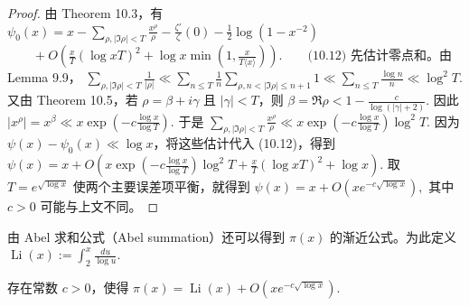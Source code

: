 \begin{proof}
	由 Theorem 10.3，有
	\(\textstyle \psi_0(x) =\allowbreak{} x - \sum_{\rho,\allowbreak{} |\Im\rho|<T}\frac{x^\rho}{\rho} - \frac{\zeta'}{\zeta}(0) - \frac12\log(1-x^{-2})\) \(\textstyle \qquad+\allowbreak{} O\left( \frac{x}{T}(\log xT)^2 +\allowbreak{} \log x\min\left(1,\allowbreak{}\frac{x}{T\langle x\rangle}\right) \right). \qquad\text{(10.12)}\)
	先估计零点和。由 Lemma 9.9，
	\(\textstyle \sum_{\rho,\allowbreak{} |\Im\rho|<T}\frac1{|\rho|} \ll\allowbreak{} \sum_{n\leq\allowbreak{} T} \frac1n \sum_{\rho,\allowbreak{} n<|\Im\rho|\leq\allowbreak{} n+\allowbreak{}1}1 \ll\allowbreak{} \sum_{n\leq\allowbreak{} T}\frac{\log n}{n} \ll\allowbreak{} \log^2 T.\)
	又由 Theorem 10.5，若 $\rho=\beta+i\gamma$ 且 $|\gamma|<T$，则
	\(\textstyle \beta =\allowbreak{} \Re\rho < 1-\frac{c}{\log(|\gamma|+\allowbreak{}2)}.\)
	因此
	\(\textstyle |x^\rho| =\allowbreak{} x^\beta \ll\allowbreak{} x\exp\left(-c\frac{\log x}{\log T}\right).\)
	于是
	\(\textstyle \sum_{\rho,\allowbreak{} |\Im\rho|<T} \frac{x^\rho}{\rho} \ll\allowbreak{} x\exp\left(-c\frac{\log x}{\log T}\right)\log^2T.\)
	因为 $\psi(x)-\psi_0(x)\ll\log x$，将这些估计代入 (10.12)，得到
	\(\textstyle \psi(x) =\allowbreak{} x +\allowbreak{} O\left( x\exp\left(-c\frac{\log x}{\log T}\right)\log^2T +\allowbreak{} \frac{x}{T}(\log xT)^2 +\allowbreak{} \log x \right).\)
	取
	\(\textstyle T=\allowbreak{}e^{\sqrt{\log x}}\)
	使两个主要误差项平衡，就得到
	\(\textstyle \psi(x) =\allowbreak{} x+\allowbreak{}O\left(xe^{-c\sqrt{\log x}}\right),\allowbreak{}\)
	其中 $c>0$ 可能与上文不同。
\end{proof}

由 Abel 求和公式（Abel summation）还可以得到 $\pi(x)$ 的渐近公式。为此定义
\(\textstyle \operatorname{Li}(x) :=\allowbreak{} \int_2^x\frac{du}{\log u}.\)

\begin{theorem}[原文 Theorem 10.7]
	存在常数 $c>0$，使得
	\(\textstyle \pi(x) =\allowbreak{} \operatorname{Li}(x) +\allowbreak{} O\left(xe^{-c\sqrt{\log x}}\right).\)
\end{theorem}

